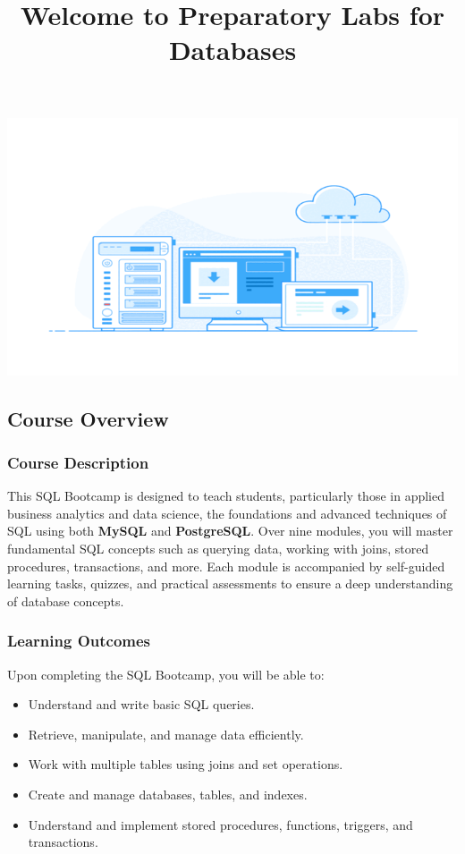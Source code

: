 \documentclass[
  letterpaper,
  DIV=11,
  numbers=noendperiod]{scrartcl}
\title{Welcome to Preparatory Labs for Databases}
\author{}
\date{}
\providecommand{\tightlist}{%
  \setlength{\itemsep}{0pt}\setlength{\parskip}{0pt}}\usepackage{longtable,booktabs,array}
\begin{document}
\maketitle


\includegraphics{index_files/mediabag/web-database-1.gif}

\subsection{Course Overview}\label{course-overview}

\subsubsection{Course Description}\label{course-description}

This SQL Bootcamp is designed to teach students, particularly those in
applied business analytics and data science, the foundations and
advanced techniques of SQL using both \textbf{MySQL} and
\textbf{PostgreSQL}. Over nine modules, you will master fundamental SQL
concepts such as querying data, working with joins, stored procedures,
transactions, and more. Each module is accompanied by self-guided
learning tasks, quizzes, and practical assessments to ensure a deep
understanding of database concepts.

\subsubsection{Learning Outcomes}\label{learning-outcomes}

Upon completing the SQL Bootcamp, you will be able to:

\begin{itemize}
\tightlist
\item
  Understand and write basic SQL queries.
\item
  Retrieve, manipulate, and manage data efficiently.
\item
  Work with multiple tables using joins and set operations.
\item
  Create and manage databases, tables, and indexes.
\item
  Understand and implement stored procedures, functions, triggers, and
  transactions.
\end{itemize}
\end{document}
